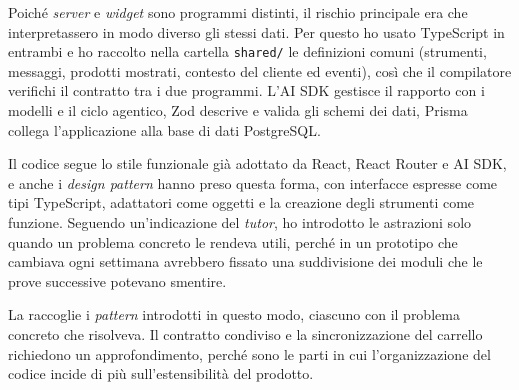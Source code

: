 Poiché \emph{server} e \emph{widget} sono programmi distinti, il rischio principale era che
interpretassero in modo diverso gli stessi dati. Per questo ho usato TypeScript in entrambi e ho
raccolto nella cartella \texttt{shared/} le definizioni comuni (strumenti, messaggi, prodotti
mostrati, contesto del cliente ed eventi), così che il compilatore verifichi il contratto tra i due
programmi. L’AI SDK gestisce il rapporto con i modelli e il ciclo agentico, Zod descrive e valida
gli schemi dei dati, Prisma collega l’applicazione alla base di dati PostgreSQL.

Il codice segue lo stile funzionale già adottato da React, React Router e AI SDK, e anche i
\emph{design pattern} hanno preso questa forma, con interfacce espresse come tipi TypeScript,
adattatori come oggetti e la creazione degli strumenti come funzione. Seguendo un’indicazione del
\emph{tutor}, ho introdotto le astrazioni solo quando un problema concreto le rendeva utili, perché
in un prototipo che cambiava ogni settimana avrebbero fissato una suddivisione dei moduli che le
prove successive potevano smentire.

La  raccoglie i \emph{pattern} introdotti in questo modo, ciascuno con il
problema concreto che risolveva. Il contratto condiviso e la sincronizzazione del carrello
richiedono un approfondimento, perché sono le parti in cui l’organizzazione del codice incide di
più sull’estensibilità del prodotto.

